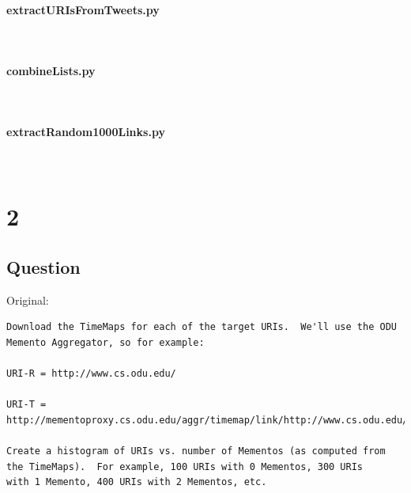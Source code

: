\documentclass[letterpaper,11pt]{article}
\begin{document}
\newpage
\paragraph{extractURIsFromTweets.py}\mbox{} \\



\newpage
\paragraph{combineLists.py}\mbox{} \\



\newpage
\paragraph{extractRandom1000Links.py}\mbox{} \\



\newpage
\section*{2}

\subsection*{Question}

Original:
\begin{verbatim}
Download the TimeMaps for each of the target URIs.  We'll use the ODU 
Memento Aggregator, so for example:

URI-R = http://www.cs.odu.edu/

URI-T = http://mementoproxy.cs.odu.edu/aggr/timemap/link/http://www.cs.odu.edu/

Create a histogram of URIs vs. number of Mementos (as computed from
the TimeMaps).  For example, 100 URIs with 0 Mementos, 300 URIs
with 1 Memento, 400 URIs with 2 Mementos, etc.
\end{verbatim}
\end{document}

